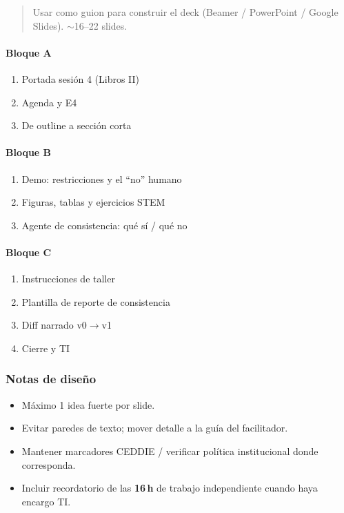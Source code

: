 \begin{quote}
Usar como guion para construir el deck (Beamer / PowerPoint / Google Slides). $\sim$16--22 slides.
\end{quote}

\paragraph{Bloque A}\begin{enumerate}
\item Portada sesión 4 (Libros II)
\item Agenda y E4
\item De outline a sección corta
\end{enumerate}
\paragraph{Bloque B}\begin{enumerate}
\item Demo: restricciones y el ``no'' humano
\item Figuras, tablas y ejercicios STEM
\item Agente de consistencia: qué sí / qué no
\end{enumerate}
\paragraph{Bloque C}\begin{enumerate}
\item Instrucciones de taller
\item Plantilla de reporte de consistencia
\item Diff narrado v0$\rightarrow$v1
\item Cierre y TI
\end{enumerate}

\subsubsection*{Notas de diseño}
\begin{itemize}
\item Máximo 1 idea fuerte por slide.
\item Evitar paredes de texto; mover detalle a la guía del facilitador.
\item Mantener marcadores CEDDIE / verificar política institucional donde corresponda.
\item Incluir recordatorio de las \textbf{16\,h} de trabajo independiente cuando haya encargo TI.
\end{itemize}
